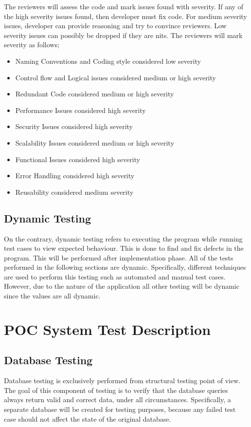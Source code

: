 \documentclass[12pt]{article}
\begin{document}
The reviewers will assess the code and mark issues found with severity. If any of the high severity issues found, then developer must fix code. For medium severity issues, developer can provide reasoning and try to convince reviewers. Low severity issues can possibly be dropped if they are nits. The reviewers will mark severity as follows;
\begin{itemize}
\item Naming Conventions and Coding style considered low severity
\item Control flow and Logical issues considered medium or high severity
\item Redundant Code considered medium or high severity
\item Performance Issues considered high severity
\item Security Issues considered high severity
\item Scalability Issues considered medium or high severity
\item Functional Issues considered high severity
\item Error Handling considered high severity
\item Reusability considered medium severity
\end{itemize}

\subsection{Dynamic Testing}
On the contrary, dynamic testing refers to executing the program while running test cases to view expected behaviour. This is done to find and fix defects in the program. This will be performed after implementation phase. All of the tests performed in the following sections are dynamic. Specifically, different techniques are used to perform this testing such as automated and manual test cases. However, due to the nature of the application all other testing will be dynamic since the values are all dynamic.

%
%

\section{POC System Test Description}

\subsection{Database Testing}
Database testing is exclusively performed from structural testing point of view. The goal of this component of testing is to verify that the database queries always return valid and correct data, under all circumstances. Specifically, a separate database will be created for testing purposes, because any failed test case should not affect the state of the original database. 
\end{document}
